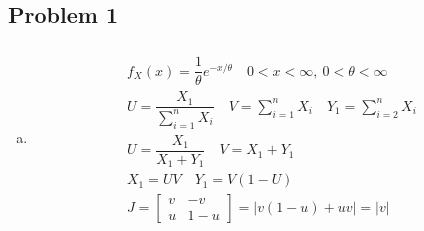 \documentclass{article}
\begin{document}
\begin{flushleft}

	\section*{Problem 1}
	
\begin{enumerate}[(a)]
	
	\item 
\begin{multline*}\\
f_X(x)=\dfrac{1}{\theta}e^{-x/\theta} \quad 0<x<\infty, \ 0<\theta<\infty\\
U=\dfrac{X_1}{\sum_{i=1}^{n}X_i} \quad V=\sum_{i=1}^{n}X_i \quad Y_1=\sum_{i=2}^{n}X_i\\
U=\dfrac{X_1}{X_1+Y_1} \quad V=X_1+Y_1\\
X_1=UV \quad Y_1=V(1-U)\\
J=\begin{bmatrix}
v&-v\\
u & 1-u
\end{bmatrix}=|v(1-u)+uv|=|v|\\
\end{multline*}


\end{enumerate}
\end{flushleft}
\end{document}
